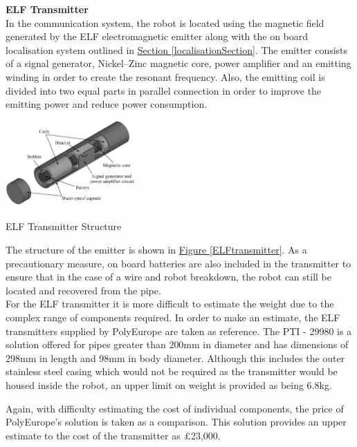 \documentclass[11pt]{article}		%
\newcommand{\supercite}[1]{\textsuperscript{\cite{#1}}}		%
\newcommand{\figref}[1]{\hyperref[#1]{Figure \ref*{#1}}}    %
\newcommand{\sectref}[1]{\hyperref[#1]{Section \ref*{#1}}}     %
\begin{document}
	        \textbf{ELF Transmitter}
            \\
	        In the communication system, the robot is located using the magnetic field generated by the ELF electromagnetic emitter along with the on board localisation system outlined in \sectref{localisationSection}. 
	        The emitter consists of a signal generator, Nickel–Zinc magnetic core, power amplifier and an emitting winding in order to create the resonant frequency. 
	        Also, the emitting coil is divided into two equal parts in parallel connection in order to improve the emitting power and reduce power consumption. 
	        \begin{floatingfigure}[r]{0.4\textwidth}
				\centering
				\includegraphics[width = 0.37\textwidth]{ELFtransmitter.jpg}
				\caption{ELF Transmitter Structure\supercite{ELFTransmitter}}
				\label{ELFtransmitter}
	        \end{floatingfigure}
            \hspace*{2ex}The structure of the emitter is shown in \figref{ELFtransmitter}. 
	        As a precautionary measure, on board batteries are also included in the transmitter to ensure that in the case of a wire and robot breakdown, the robot can still be located and recovered from the pipe. 
            \\
            \hspace*{2ex}For the ELF transmitter it is more difficult to estimate the weight due to the complex range of components required. In order to make an estimate, the ELF transmitters supplied by PolyEurope are taken as reference. The PTI - 29980 is a solution offered for pipes greater than 200mm in diameter and has dimensions of 298mm in length and 98mm in body diameter. Although this includes the outer stainless steel casing which would not be required as the transmitter would be housed inside the robot, an upper limit on weight is provided as being 6.8kg.\\
			\begin{floatingfigure}[r]{0pt} \end{floatingfigure}
		    \hspace*{2ex}Again, with difficulty estimating the cost of individual components, the price of PolyEurope’s solution is taken as a comparison. This solution provides an upper estimate to the cost of the transmitter as £23,000. 
			
\end{document}
